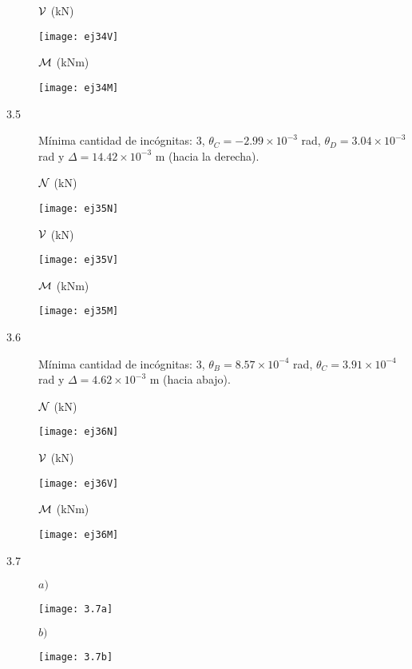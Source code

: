 \begin{description}
${\mathcal V}$ (kN)

\begin{center}
	\texttt{[image: ej34V]}
\end{center}

${\mathcal M}$ (kNm)

\begin{center}
	\texttt{[image: ej34M]}
\end{center}


\item [3.5]

Mínima cantidad de incógnitas: 3, $\theta_C = -2.99 \times 10^{-3}$ rad, $ \theta_D = 3.04 \times 10^{-3}$ rad y $\Delta  = 14.42 \times 10^{-3}$ m (hacia la derecha).
%

${\mathcal N}$ (kN)

\begin{center}
	\texttt{[image: ej35N]}
\end{center}

${\mathcal V}$ (kN)

\begin{center}
	\texttt{[image: ej35V]}
\end{center}

${\mathcal M}$ (kNm)

\begin{center}
	\texttt{[image: ej35M]}
\end{center}



\item[3.6]
Mínima cantidad de incógnitas: 3, $\theta_B = 8.57 \times 10^{-4}$ rad, $\theta_C = 3.91 \times 10^{-4}$ rad y $\Delta  = 4.62 \times 10^{-3} $ m (hacia abajo).

${\mathcal N}$ (kN)

\begin{center}
	\texttt{[image: ej36N]}
\end{center}

${\mathcal V}$ (kN)

\begin{center}
	\texttt{[image: ej36V]}
\end{center}

${\mathcal M}$ (kNm)

\begin{center}
	\texttt{[image: ej36M]}
\end{center}

\item[3.7]

$a)$

\begin{center}
	\texttt{[image: 3.7a]}
\end{center}

$b)$

\begin{center}
	\texttt{[image: 3.7b]}
\end{center}

\end{description}

